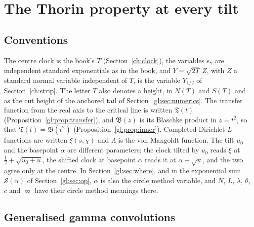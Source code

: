 \section{The Thorin property at every tilt}\label{gl:sec:thorin}

\subsection{Conventions}

The centre clock is the book's $T$ (Section~\ref{ch:clock}), the variables $e_\gamma$ are independent standard exponentials as in the book, and $Y=\sqrt{2T}\,Z$, with $Z$ a standard normal variable independent of $T$, is the variable $Y_{1/2}$ of Section~\ref{ch:strip}. The letter $T$ also denotes a height, in $N(T)$ and $S(T)$ and as the cut height of the anchored tail of Section~\ref{gl:sec:numerics}. The transfer function from the real axis to the critical line is written $\mathfrak T(t)$ (Proposition~\ref{gl:prop:transfer}), and $\mathfrak B(z)$ is its Blaschke product in $z=t^2$, so that $\mathfrak T(t)=\mathfrak B(t^2)$ (Proposition~\ref{gl:prop:inner}). Completed Dirichlet $L$ functions are written $\xi(s,\chi)$ and $\Lambda$ is the von Mangoldt function. The tilt $u_0$ and the basepoint $\alpha$ are different parameters: the clock tilted by $u_0$ reads $\xi$ at $\tfrac12+\sqrt{u_0+u}$, the shifted clock at basepoint $\alpha$ reads it at $\alpha+\sqrt u$, and the two agree only at the centre. In Section~\ref{gl:sec:where}, and in the exponential sum $\mathcal S(\alpha)$ of Section~\ref{gl:sec:op}, $\alpha$ is also the circle method variable, and $N$, $L$, $\lambda$, $\theta$, $c$ and $\varpi$ have their circle method meanings there.

\subsection{Generalised gamma convolutions}

